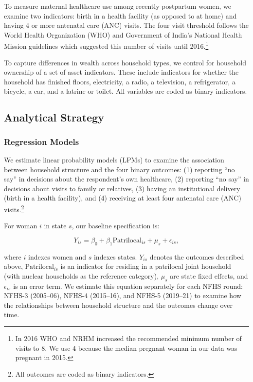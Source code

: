 \documentclass[12pt]{article}
\begin{document}
To measure maternal healthcare use among recently postpartum women, we examine two indicators: birth in a health facility (as opposed to at home) and having 4 or more antenatal care (ANC) visits. The four visit threshold follows the World Health Organization (WHO) and Government of India’s National Health Mission guidelines which suggested this number of visits until 2016.\footnote{In 2016 WHO and NRHM increased the recommended minimum number of visits to 8.  We use 4 because the median pregnant woman in our data was pregnant in 2015.}

To capture differences in wealth across household types, we control for household ownership of a set of asset indicators. These include indicators for whether the household has finished floors, electricity, a radio, a television, a refrigerator, a bicycle, a car, and a latrine or toilet. All variables are coded as binary indicators.

\subsection{Analytical Strategy}
\subsubsection{Regression Models}

We estimate linear probability models (LPMs) to examine the association between household structure and the four binary outcomes: (1) reporting ``no say'' in decisions about the respondent's own healthcare, (2) reporting ``no say'' in decisions about visits to family or relatives, (3) having an institutional delivery (birth in a health facility), and (4) receiving at least four antenatal care (ANC) visits.\footnote{All outcomes are coded as binary indicators.}

For woman $i$ in state $s$, our baseline specification is:

\begin{equation} \label{eq:nocontrols}
Y_{is} = \beta_0 + \beta_1 \text{Patrilocal}_{is} + \mu_s + \epsilon_{is},
\end{equation}

where $i$ indexes women and $s$ indexes states. $Y_{is}$ denotes the outcomes described above, $\text{Patrilocal}_{is}$ is an indicator for residing in a patrilocal joint household (with nuclear households as the reference category), $\mu_s$ are state fixed effects, and $\epsilon_{is}$ is an error term. We estimate this equation separately for each NFHS round: NFHS-3 (2005--06), NFHS-4 (2015--16), and NFHS-5 (2019--21) to examine how the relationships between household structure and the outcomes change over time.
\end{document}
